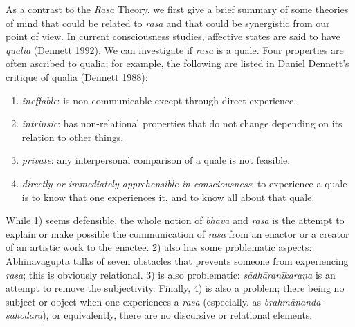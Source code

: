 As a contrast to the \textsl{Rasa} Theory, we first give a brief summary of some theories of mind that could be related to \textsl{rasa} and that could be synergistic from our point of view. In current consciousness studies, affective states are said to have \textsl{qualia} (Dennett 1992). We can investigate if \textsl{rasa} is a quale. Four properties are often ascribed to qualia; for example, the following are listed in Daniel Dennett's critique of qualia (Dennett 1988): 
\begin{enumerate}
\item \textsl{ineffable}: is non-communicable except through direct experience.
\item \textsl{intrinsic}: has non-relational properties that do not change depending on its relation to other things.
\item \textsl{private}: any interpersonal comparison of a quale is not feasible.
\item  \textsl{directly or immediately apprehensible in consciousness}: to experience a quale is to know that one experiences it, and to know all about that quale.
\end{enumerate}

While 1) seems defensible, the whole notion of \textsl{bhāva} and \textsl{rasa} is the attempt to explain or make possible the communication of \textsl{rasa} from an enactor or a creator of an artistic work to the enactee. 2) also has some problematic aspects: Abhinavagupta talks of seven obstacles that prevents someone from experiencing \textsl{rasa}; this is obviously relational. 3) is also problematic: \textsl{sādhāranīkaraṇa} is an attempt to remove the subjectivity. Finally, 4) is also a problem; there being no subject or object when one experiences a \textsl{rasa} (especially. as \textsl{brahmānanda-sahodara}), or equivalently, there are no discursive or relational elements.

